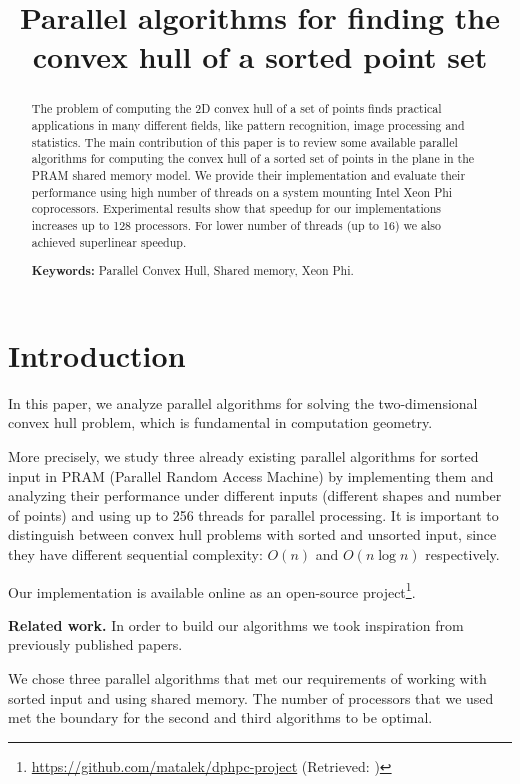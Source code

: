 \documentclass[letterpaper]{article}
\title{Parallel algorithms for finding the convex hull of a sorted point set}
\newcommand{\mypar}[1]{{\bf #1.}}
\theoremstyle{definition}
\begin{document}
%
\maketitle
%

\begin{abstract}
The problem of computing the 2D convex hull of a set of points finds practical applications in many different fields, like pattern recognition, image processing and statistics.
The main contribution of this paper is to review some available parallel algorithms for computing the convex hull of a sorted set of points in the plane in the PRAM shared memory model.
We provide their implementation and evaluate their performance using high number of threads on a system mounting Intel Xeon Phi coprocessors.
Experimental results show that speedup for our implementations increases up to 128 processors.
For lower number of threads (up to 16) we also achieved superlinear speedup.

\textbf{Keywords:} Parallel Convex Hull, Shared memory, Xeon Phi.

\end{abstract}

\section{Introduction}\label{sec:intro}

In this paper, we analyze parallel algorithms for solving the two-dimensional convex hull problem, which is fundamental in computation geometry.

More precisely, we study three already existing parallel algorithms for sorted input in PRAM (Parallel Random Access Machine) by implementing them and analyzing their performance under different inputs (different shapes and number of points) and using up to 256 threads for parallel processing.
It is important to distinguish between convex hull problems with sorted and unsorted input, since they have different sequential complexity: $O(n)$ and $O(n\log n)$ respectively.

Our implementation is available online as an open-source project\footnote{\url{https://github.com/matalek/dphpc-project} (Retrieved: )}.

\mypar{Related work} In order to build our algorithms we took inspiration from previously published papers.

We chose three parallel algorithms that met our requirements of working with sorted input and using shared memory.
The number of processors that we used met the boundary for the second and third algorithms to be optimal. 
\end{document}

